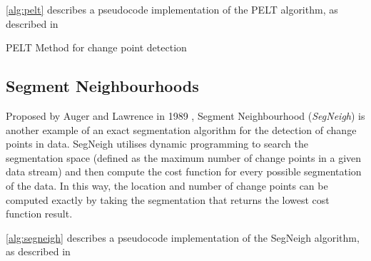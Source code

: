 \documentclass{uvamscse}	%
\begin{document}
\autoref{alg:pelt} describes a pseudocode implementation of the PELT algorithm, as described in \cite{Eckley2011}\newline

\begin{algorithm}[H]
    \label{alg:pelt}
    \caption{PELT Method for change point detection}
    \DontPrintSemicolon
\end{algorithm}

\subsection{Segment Neighbourhoods}

Proposed by Auger and Lawrence in 1989 \cite{Auger1989}, Segment Neighbourhood (\emph{SegNeigh}) is another example of an exact segmentation algorithm for the detection of change points in data. SegNeigh utilises dynamic programming to search the segmentation space (defined as the maximum number of change points in a given data stream) and then compute the cost function for every possible segmentation of the data. In this way, the location and number of change points can be computed exactly by taking the segmentation that returns the lowest cost function result.

\autoref{alg:segneigh} describes a pseudocode implementation of the SegNeigh algorithm, as described in \cite{Eckley2011}\newline
\end{document}
